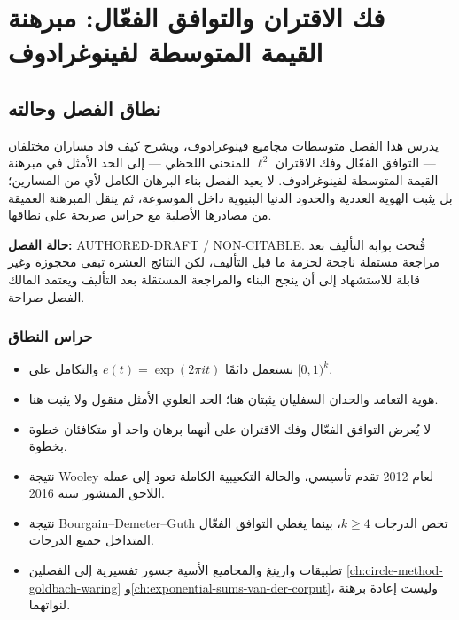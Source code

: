 \chapter{فك الاقتران والتوافق الفعّال: مبرهنة القيمة المتوسطة لفينوغرادوف}
\label{ch:decoupling-efficient-congruencing-vmvt}

\section*{نطاق الفصل وحالته}

يدرس هذا الفصل متوسطات مجاميع فينوغرادوف، ويشرح كيف قاد مساران مختلفان --- التوافق الفعّال وفك الاقتران \(\ell^2\) للمنحنى اللحظي --- إلى الحد الأمثل في مبرهنة القيمة المتوسطة لفينوغرادوف. لا يعيد الفصل بناء البرهان الكامل لأي من المسارين؛ بل يثبت الهوية العددية والحدود الدنيا البنيوية داخل الموسوعة، ثم ينقل المبرهنة العميقة من مصادرها الأصلية مع حراس صريحة على نطاقها.

\noindent\textbf{حالة الفصل:}
\textenglish{AUTHORED-DRAFT / NON-CITABLE}. فُتحت بوابة التأليف بعد مراجعة مستقلة ناجحة لحزمة ما قبل التأليف، لكن النتائج العشرة تبقى محجوزة وغير قابلة للاستشهاد إلى أن ينجح البناء والمراجعة المستقلة بعد التأليف ويعتمد المالك الفصل صراحة.

\subsection*{حراس النطاق}
\begin{itemize}
  \item نستعمل دائمًا \(e(t)=\exp(2\pi i t)\) والتكامل على \([0,1)^k\).
  \item هوية التعامد والحدان السفليان يثبتان هنا؛ الحد العلوي الأمثل منقول ولا يثبت هنا.
  \item لا يُعرض التوافق الفعّال وفك الاقتران على أنهما برهان واحد أو متكافئان خطوة بخطوة.
  \item نتيجة Wooley لعام 2012 تقدم تأسيسي، والحالة التكعيبية الكاملة تعود إلى عمله اللاحق المنشور سنة 2016.
  \item نتيجة Bourgain--Demeter--Guth تخص الدرجات \(k\ge4\)، بينما يغطي التوافق الفعّال المتداخل جميع الدرجات.
  \item تطبيقات وارينغ والمجاميع الأسية جسور تفسيرية إلى الفصلين \ref{ch:circle-method-goldbach-waring} و\ref{ch:exponential-sums-van-der-corput}، وليست إعادة برهنة لنواتهما.
\end{itemize}

